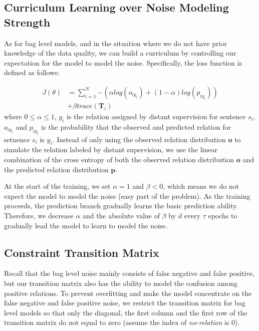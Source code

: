 \subsection{Curriculum Learning over Noise Modeling Strength}
As for bag level models, and in the situation where we do not have prior knowledge of the data quality, we can build a curriculum by controlling our expectation for the model to model the noise. Specifically, the loss function is defined as follows:

\begin{equation}
\begin{aligned}
J(\theta)	&=\sum_{i=1}^N{-(\alpha log(o_{iy_{i}}) + (1-\alpha) log(p_{iy_{i}}))} \\
&+ \beta trace(\mathbf{T}_{i})
\end{aligned}
\end{equation}
where $0\le\alpha\le1$, $y_i$ is the relation assigned by distant supervision for sentence $s_i$, $o_{iy_{i}}$ and $p_{iy_{i}}$ is the probability that the observed and predicted relation for setnence $s_i$ is $y_i$.  Instead of only using the observed relation distribution $\mathbf{o}$ to simulate the relation labeled by distant supervision, we use the linear combination of the cross entropy of both the observed relation distribution $\mathbf{o}$ and the predicted relation distribution $\mathbf{p}$.

At the start of the training, we set $\alpha=1$ and $\beta<0$, which means we do not expect the model to model the noise (easy part of the problem). As the training proceeds, the prediction branch gradually learns the basic prediction ability. Therefore, we decrease $\alpha$ and the absolute value of $\beta$ by $d$ every $\tau$ epochs to gradually lead the model to learn to model the noise.

\subsection{Constraint Transition Matrix}
Recall that the bag level noise mainly consists of false negative and false positive, but our transition matrix also has the ability to model the confusion among positive relations. To prevent overfitting and make the model concentrate on the false negative and false positive noise, we restrict the transition matrix for bag level models so that only the diagonal, the first column and the first row of the transition matrix do not equal to zero (assume the index of \emph{no-relation} is 0). 